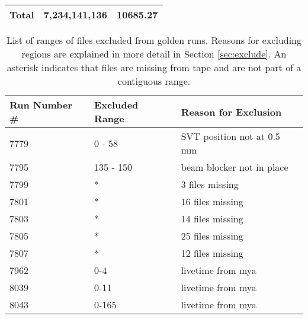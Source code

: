 \documentclass[11pt]{article}
\begin{document}
\begin{longtable}[!hbtp]{l r r}
\hline
Total	&	7,234,141,136	&	10685.27	\\
  \hline
  \hline

\end{longtable}  

\begin{table}[htp]
\caption{List of ranges of files excluded from golden runs.  Reasons for excluding regions are explained in more detail in Section \ref{sec:exclude}.  An asterisk indicates that files are missing from tape and are not part of a contiguous range.}
\begin{center}
\begin{tabular}{l l l}
Run Number \# & Excluded Range & Reason for Exclusion \\
\hline
7779 & 0 - 58  & SVT position not at 0.5 mm\\
7795 & 135 - 150 & beam blocker not in place \\
7799 & * & 3 files missing \\
7801 & * & 16 files missing \\
7803 & * & 14 files missing \\
7805 & * & 25 files missing \\
7807 & * & 12 files missing \\
7962 & 0-4 & livetime from mya \\
8039 & 0-11 & livetime from mya \\
8043 & 0-165 & livetime from mya \\

\end{tabular}
\end{center}
\label{tbl:excluded_file_ranges}
\end{table}%
\end{document}
